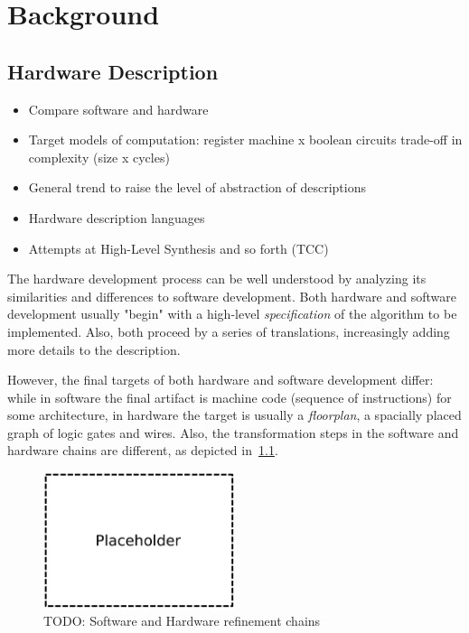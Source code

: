 \chapter{Background}
\label{chap:hardware}

    \section{Hardware Description}
    \label{sec:hardware-description}
        \begin{itemize}
            \item Compare software and hardware
            \item Target models of computation: register machine x boolean circuits
                \subitem trade-off in complexity (size x cycles)

            \item General trend to raise the level of abstraction of descriptions
            \item Hardware description languages

            \item Attempts at High-Level Synthesis and so forth (TCC)
        \end{itemize}

        The hardware development process can be well understood by analyzing its
        similarities and differences to software development.
        Both hardware and software development usually "begin" with a high-level \emph{specification}
        of the algorithm to be implemented.
        Also, both proceed by a series of translations, increasingly adding more details to the description.

        However, the final targets of both hardware and software development differ:
        while in software the final artifact is machine code (sequence of instructions) for some architecture,
        in hardware the target is usually a \emph{floorplan}, a spacially placed graph of logic gates and wires.
        Also, the transformation steps in the software and hardware chains are different,
        as depicted in~\ref{fig:sw-hw-chains}.

        \begin{figure}[h]
            \centerline{\includegraphics[width=0.5\textwidth]{imgs/sw-hw-chains.pdf}}
            \caption{TODO: Software and Hardware refinement chains \label{fig:sw-hw-chains}}
        \end{figure}

